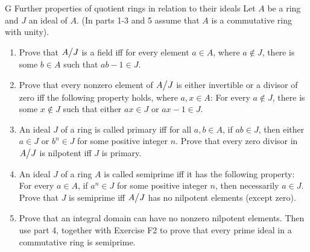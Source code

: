 \begin{exercise}{G Further properties of quotient rings in relation to their ideals}
Let $A$ be a ring and $J$ an ideal of $A$. (In parts 1-3 and 5 assume that $A$ is a commutative ring with unity).
  \begin{enumerate}
      \item Prove that ${\textstyle A}\big/{\textstyle J}$ is a field iff for every element $a\in A$, where $a\notin J$, there is some $b\in A$ such that $ab-1\in J$.
      \item Prove that every nonzero element of ${\textstyle A}\big/{\textstyle J}$ is either invertible or a divisor of zero iff the following property holds, where $a,x\in A$: For every $a\notin J$, there is some $x\notin J$ such that either $ax\in J$ or $ax-1\in J$.
      \item An ideal $J$ of a ring is called primary iff for all $a,b\in A$, if $ab\in J$, then either $a\in J$ or $b^{n}\in J$ for some positive integer $n$. Prove that every zero divisor in ${\textstyle A}\big/{\textstyle J}$ is nilpotent iff $J$ is primary.
      \item An ideal $J$ of a ring $A$ is called semiprime iff it has the following property: For every $a\in A$, if $a^{n}\in J$ for some positive integer $n$, then necessarily $a\in J$. Prove that $J$ is semiprime iff ${\textstyle A}\big/{\textstyle J}$ has no nilpotent elements (except zero).
      \item Prove that an integral domain can have no nonzero nilpotent elements. Then use part 4, together with Exercise F2 to prove that every prime ideal in a commutative ring is semiprime.
  \end{enumerate}
\end{exercise}

